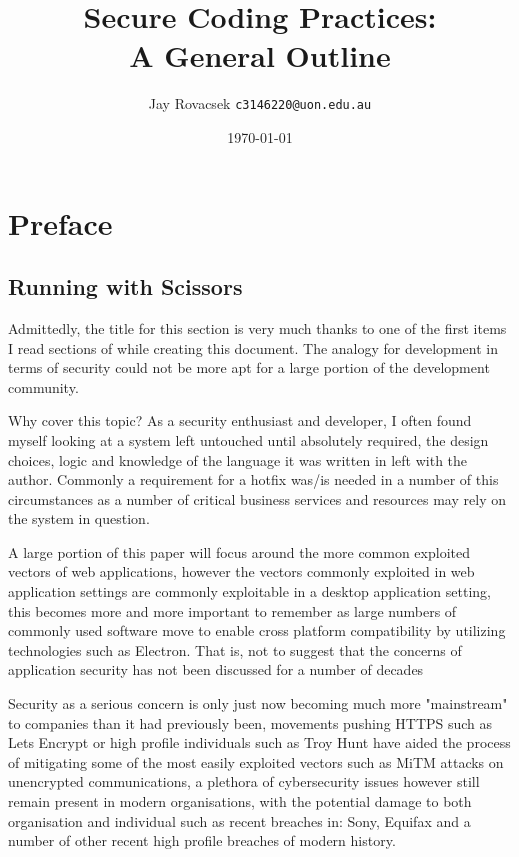 \documentclass{IEEEtran}
\title{Secure Coding Practices:
    \protect\\A General Outline}
\author{
        Jay Rovacsek
        \texttt{c3146220@uon.edu.au}\\
    }
\date{\today}
\begin{document}
    \begin{titlingpage}
        \maketitle
    \end{titlingpage}
    \newpage
    \onecolumn

    \tableofcontents

    \newpage
    \twocolumn

    \section{Preface}
    \subsection{Running with Scissors}
        Admittedly, the title for this section is very much thanks to one of the first
        items\cite{Seacord} I read sections of while creating this document. The analogy for 
        development in terms of security could not be more apt for a large portion of the development 
        community.

        Why cover this topic? As a security enthusiast and developer, I often found myself 
        looking at a system left untouched until absolutely required, the design choices, logic and
        knowledge of the language it was written in left with the author. Commonly a requirement 
        for a hotfix was/is needed in a number of this circumstances as a number of critical 
        business services and resources may rely on the system in question.

        A large portion of this paper will focus around the more common exploited vectors of 
        web applications, however the vectors commonly exploited in web application settings are
        commonly exploitable in a desktop application setting, this becomes more and more important 
        to remember as large numbers of commonly used software move to enable cross platform compatibility 
        by utilizing technologies such as Electron\cite{ElectronFramework}.
        That is, not to suggest that the concerns of application security has not been 
        discussed for a number of decades\cite{Booysena1995}

        Security as a serious concern is only just now becoming much more "mainstream" to companies than 
        it had previously been\cite{howard2004building}, movements pushing HTTPS such as Lets Encrypt\cite{LetsEncrypt} or high profile
        individuals such as Troy Hunt\cite{TroyHuntHttpsIsEasy} have aided the process of mitigating 
        some of the most easily exploited vectors such as MiTM attacks on unencrypted communications, a 
        plethora of cybersecurity issues however still remain present in modern organisations, with the 
        potential damage to both organisation and individual\cite{apvrille2005secure} such as recent breaches in: Sony\cite{Sony-Breach},
        Equifax\cite{Equifax-Breach} and a number of other recent high profile breaches of modern history.
\end{document}
